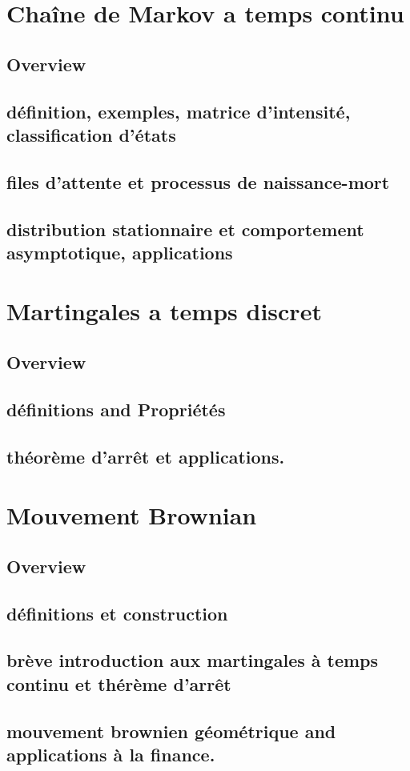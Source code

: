 \documentclass{article}
\begin{document}
\section{Chaîne de Markov a temps continu}
\subsection{Overview}
\subsection{définition, exemples, matrice d’intensité, classification d’états}
\subsection{files d’attente et processus de naissance-mort}
\subsection{distribution stationnaire et comportement asymptotique, applications}
\pagebreak

\section{Martingales a temps discret}
\subsection{Overview}
\subsection{définitions and Propriétés}
\subsection{théorème d’arrêt et applications.}
\pagebreak

\section{Mouvement Brownian}
\subsection{Overview}
\subsection{définitions et construction}
\subsection{brève introduction aux martingales à temps continu et thérème d’arrêt}
\subsection{mouvement brownien géométrique and applications à la finance.}

\pagebreak
\end{document}
